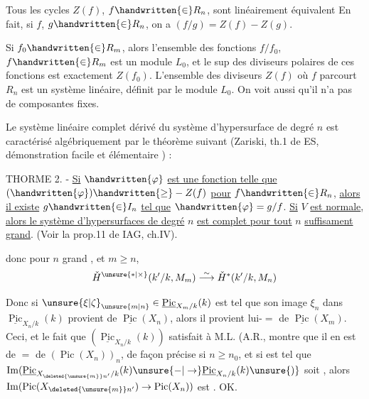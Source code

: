 Tous les cycles $Z(f)$, $f\handwritten{\in}R_n$, sont linéairement équivalent En
fait, si $f$, $g\handwritten{\in}R_n$, on a $(f/g)=Z(f)-Z(g)$.

Si $f_0\handwritten{\in}R_m$, alors l'ensemble des fonctions $f/f_0$, $f\handwritten{\in}R_m$ est
un module $L_0$, et le sup des diviseurs polaires de ces fonctions est
exactement $Z(f_0)$. L'ensemble des diviseurs $Z(f)$ où $f$ parcourt $R_n$ est
un système linéaire, définit par le module $L_0$. On voit aussi qu'il
n'a pas de composantes fixes.

Le système linéaire complet dérivé du système d'hypersurface
de degré $n$ est caractérisé algébriquement par le théorème suivant
(Zariski, th.1 de ES, démonstration facile et élémentaire ) :

THORME 2. - \uline{Si} $\handwritten{\varphi}$ \uline{est une fonction telle que} $(\handwritten{\varphi})\handwritten{\geq}-Z(f)$ \uline{pour}
$f\handwritten{\in}R_n$, \uline{alors il existe} $g\handwritten{\in}I_n$ \uline{tel que} $\handwritten{\varphi}=g/f$. \uline{Si} $V$ \uline{est normale},
\uline{alors le système d'hypersurfaces de degré} $n$ \uline{est complet pour tout} $n$
\uline{suffisament grand}. (Voir la prop.11 de IAG, ch.IV).

donc pour $n$ grand , et $m\geq n$,
\[
\check H^{\unsure{*|\times}}(k'/k,M_m)\overset{\sim}{\longrightarrow}\check H^*(k'/k,M_n)
\]


 Donc si
$\unsure{\xi|\zeta}_{\unsure{m|n}}\in\underline{\operatorname{Pic}}_{X_m/k}(k)$ est tel que son image
$\xi_n$ dans $\underline{\operatorname{Pic}}_{X_n/k}(k)$ provient de $\underline{\operatorname{Pic}}(X_n)$, alors
il provient lui-$=$ de $\underline{\operatorname{Pic}}(X_m)$. Ceci, et
le fait que $(\underline{\operatorname{Pic}}_{X_n/k}(k))$ satisfait à
M.L. (A.R., montre que il en est
de $=$ de $(\operatorname{Pic}(X_n))_n$, de façon
précise si $n\geq n_0$, 
et si  est tel que $\operatorname{Im}(\underline{\operatorname{Pic}}_{X_{\deleted{\unsure{m}}n'}/k}(k)\unsure{-|\to}\underline{\operatorname{Pic}}_{X_n/k}(k)\unsure{)}$
soit , alors $\operatorname{Im}(\operatorname{Pic}(X_{\deleted{\unsure{m}}n'})\to\operatorname{Pic}(X_n))$
est . OK.

